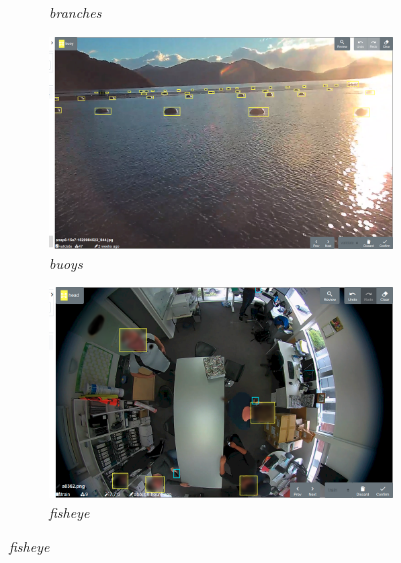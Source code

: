 \begin{figure}[h!]
\begin{subfigure}[t]{0.24\linewidth}
   \caption{\emph{branches}}
\end{subfigure}%
\begin{subfigure}[t]{0.24\linewidth}
  \includegraphics[width=1.0\linewidth]{figures/annotation/screenshots/buoys.png}
   \caption{\emph{buoys}}
 \end{subfigure}
\begin{subfigure}[t]{0.24\linewidth}
  \includegraphics[width=1.0\linewidth]{figures/annotation/screenshots/victor.png}
  \caption{\emph{fisheye}}
\end{subfigure}%


\end{figure}
